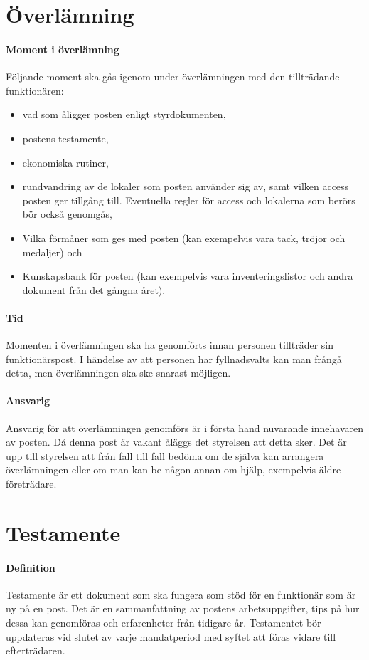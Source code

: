 \documentclass{dsekguideline}
\begin{document}
\section{Överlämning}

\paragraph{Moment i överlämning}
Följande moment ska gås igenom under överlämningen med den tillträdande
funktionären:
\begin{itemize}
\item vad som åligger posten enligt styrdokumenten,
\item postens testamente,
\item ekonomiska rutiner,
\item rundvandring av de lokaler som posten använder sig av, samt vilken access
  posten ger tillgång till. Eventuella regler för access och lokalerna som
  berörs bör också genomgås,
\item Vilka förmåner som ges med posten (kan exempelvis vara tack, tröjor och
  medaljer) och
\item Kunskapsbank för posten (kan exempelvis vara inventeringslistor och andra
  dokument från det gångna året).
\end{itemize}

\paragraph{Tid}
Momenten i överlämningen ska ha genomförts innan personen tillträder sin
funktionärspost. I händelse av att personen har fyllnadsvalts kan man frångå
detta, men överlämningen ska ske snarast möjligen.

\paragraph{Ansvarig}
Ansvarig för att överlämningen genomförs är i första hand nuvarande innehavaren
av posten. Då denna post är vakant åläggs det styrelsen att detta sker. Det är
upp till styrelsen att från fall till fall bedöma om de själva kan arrangera
överlämningen eller om man kan be någon annan om hjälp, exempelvis äldre
företrädare.

\section{Testamente}

\paragraph{Definition} Testamente är ett dokument som ska fungera som stöd för
en funktionär som är ny på en post. Det är en sammanfattning av postens
arbetsuppgifter, tips på hur dessa kan genomföras och erfarenheter från
tidigare år. Testamentet bör uppdateras vid slutet av varje mandatperiod med
syftet att föras vidare till efterträdaren.
\end{document}
